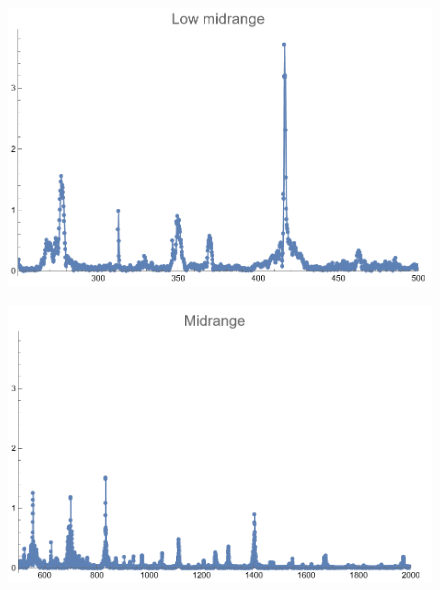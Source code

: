 \documentclass[12pt, letterpaper]{article}
\begin{document}
\begin{figure}[H]
  \centering
  \begin{minipage}{.5\textwidth}
    \centering
    \includegraphics[width=.9\linewidth]{imgs/Cancion4/lowmid.png}
    \label{fig:04d}
  \end{minipage}%
  \begin{minipage}{.5\textwidth}
    \centering
    \includegraphics[width=.9\linewidth]{imgs/Cancion4/mid.png}
    \label{fig:04e}
  \end{minipage}
\end{figure}
\end{document}

